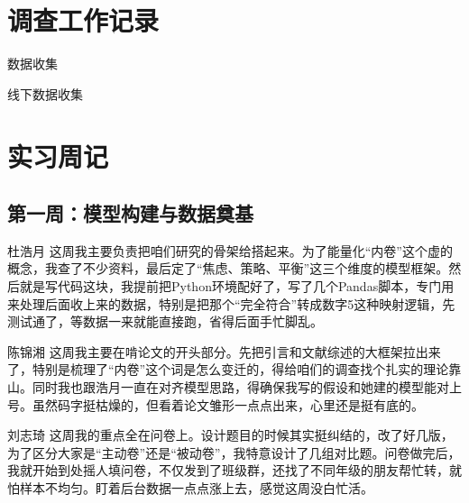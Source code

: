 \documentclass[win,thesis]{hustreport} %
\begin{document}
\begin{appendixblock}
\section*{调查工作记录}
	\begin{parallelfigures}{数据收集}
\end{parallelfigures}

	\begin{parallelfigures}{线下数据收集}
\end{parallelfigures}


\newpage
\section{实习周记}

\subsection{第一周：模型构建与数据奠基}

\begin{cdkzero}{杜浩月}
	这周我主要负责把咱们研究的骨架给搭起来。为了能量化“内卷”这个虚的概念，我查了不少资料，最后定了“焦虑、策略、平衡”这三个维度的模型框架。然后就是写代码这块，我提前把Python环境配好了，写了几个Pandas脚本，专门用来处理后面收上来的数据，特别是把那个“完全符合”转成数字5这种映射逻辑，先测试通了，等数据一来就能直接跑，省得后面手忙脚乱。
\end{cdkzero}

\begin{cdkzero}{陈锦湘}
	这周我主要在啃论文的开头部分。先把引言和文献综述的大框架拉出来了，特别是梳理了“内卷”这个词是怎么变迁的，得给咱们的调查找个扎实的理论靠山。同时我也跟浩月一直在对齐模型思路，得确保我写的假设和她建的模型能对上号。虽然码字挺枯燥的，但看着论文雏形一点点出来，心里还是挺有底的。
\end{cdkzero}

\begin{cdkzero}{刘志琦}
	这周我的重点全在问卷上。设计题目的时候其实挺纠结的，改了好几版，为了区分大家是“主动卷”还是“被动卷”，我特意设计了几组对比题。问卷做完后，我就开始到处摇人填问卷，不仅发到了班级群，还找了不同年级的朋友帮忙转，就怕样本不均匀。盯着后台数据一点点涨上去，感觉这周没白忙活。
\end{cdkzero}


\end{appendixblock}
\end{document}
